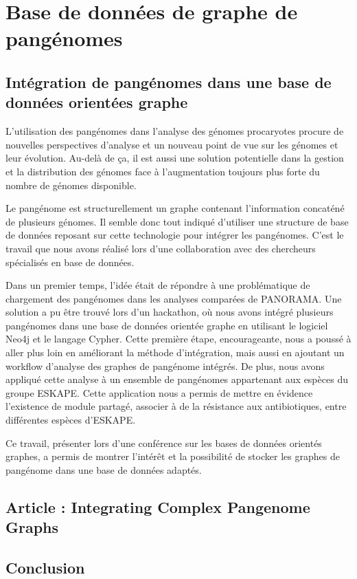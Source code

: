 \part{Base de données de graphe de pangénomes}
\label{part:DBpan}
\chapter{Intégration de pangénomes dans une base de données orientées graphe}

L'utilisation des pangénomes dans l'analyse des génomes procaryotes procure de nouvelles perspectives d'analyse et un nouveau point de vue sur les génomes et leur évolution. Au-delà de ça, il est aussi une solution potentielle dans la gestion et la distribution des génomes face à l'augmentation toujours plus forte du nombre de génomes disponible.

Le pangénome est structurellement un graphe contenant l'information concaténé de plusieurs génomes. Il semble donc tout indiqué d'utiliser une structure de base de données reposant sur cette technologie pour intégrer les pangénomes. C'est le travail que nous avons réalisé lors d'une collaboration avec des chercheurs spécialisés en base de données. 

Dans un premier temps, l'idée était de répondre à une problématique de chargement des pangénomes dans les analyses comparées de PANORAMA. Une solution a pu être trouvé lors d'un hackathon, où nous avons intégré plusieurs pangénomes dans une base de données orientée graphe en utilisant le logiciel Neo4j et le langage Cypher. Cette première étape, encourageante, nous a poussé à aller plus loin en améliorant la méthode d'intégration, mais aussi en ajoutant un workflow d'analyse des graphes de pangénome intégrés. De plus, nous avons appliqué cette analyse à un ensemble de pangénomes appartenant aux espèces du groupe ESKAPE. Cette application nous a permis de mettre en évidence l'existence de module partagé, associer à de la résistance aux antibiotiques, entre différentes espèces d'ESKAPE.

Ce travail, présenter lors d'une conférence sur les bases de données orientés graphes, a permis de montrer l'intérêt et la possibilité de stocker les graphes de pangénome dans une base de données adaptés.

\chapter{Article : Integrating Complex Pangenome Graphs}



\chapter{Conclusion}

